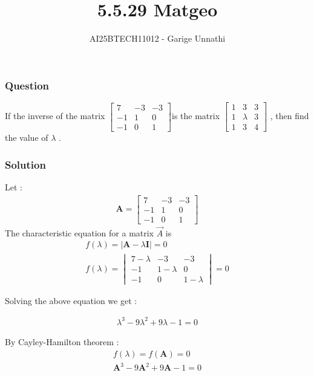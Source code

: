 \documentclass{beamer}
\title{5.5.29 Matgeo}
\author{AI25BTECH11012 - Garige Unnathi}
\date{}
\begin{document}
\frame{\titlepage}

\begin{frame}
\frametitle{Question}
If the inverse of the matrix  $\begin{bmatrix}7 &-3&-3\\
                                    -1&1&0\\
                                     -1&0&1\end{bmatrix}$is the matrix  $\begin{bmatrix}1&3&3\\1&\lambda&3\\1&3&4\end{bmatrix}$ , then find the value of $\lambda$ .
\end{frame}


\begin{frame}
\frametitle{Solution}
   
Let : 
\begin{align*}
    \textbf{A}  = \begin{bmatrix}7 &-3&-3\\
                      -1&1&0\\
                      -1&0&1\end{bmatrix}
\end{align*}
The characteristic equation for a matrix $\vec{A}$ is  
\begin{align}
 f(\lambda) =  \lvert \textbf{A} - \lambda\textbf{I} \rvert = 0\\
 f(\lambda) = \begin{vmatrix}7-\lambda &-3&-3\\
                      -1&1-\lambda&0\\
                      -1&0&1-\lambda\end{vmatrix} = 0
\end{align}
\end{frame}



\begin{frame}
Solving the above equation we get :

\begin{align}
  \lambda^3 - 9\lambda^2 + 9\lambda - 1 = 0
\end{align}

By Cayley-Hamilton theorem :
\begin{align}
  f(\lambda) = f(\textbf{A}) = 0 \\
  \textbf{A}^3 -9\textbf{A}^2 + 9\textbf{A} -1 =0
\end{align}
\end{frame}
\end{document}
